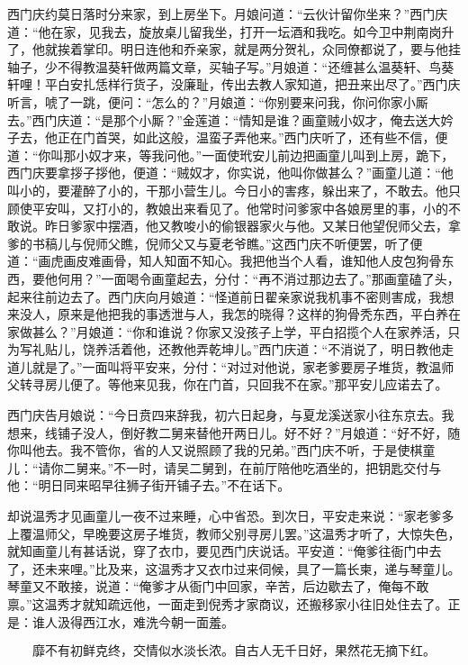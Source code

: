 西门庆约莫日落时分来家，到上房坐下。月娘问道：“云伙计留你坐来？”西门庆道：“他在家，见我去，旋放桌儿留我坐，打开一坛酒和我吃。如今卫中荆南岗升了，他就挨着掌印。明日连他和乔亲家，就是两分贺礼，众同僚都说了，要与他挂轴子，少不得教温葵轩做两篇文章，买轴子写。”月娘道：“还缠甚么温葵轩、鸟葵轩哩！平白安扎恁样行货子，没廉耻，传出去教人家知道，把丑来出尽了。”西门庆听言，唬了一跳，便问：“怎么的？”月娘道：“你别要来问我，你问你家小厮去。”西门庆道：“是那个小厮？”金莲道：“情知是谁？画童贼小奴才，俺去送大妗子去，他正在门首哭，如此这般，温蛮子弄他来。”西门庆听了，还有些不信，便道：“你叫那小奴才来，等我问他。”一面使玳安儿前边把画童儿叫到上房，跪下，西门庆要拿拶子拶他，便道：“贼奴才，你实说，他叫你做甚么？”画童儿道：“他叫小的，要灌醉了小的，干那小营生儿。今日小的害疼，躲出来了，不敢去。他只顾使平安叫，又打小的，教娘出来看见了。他常时问爹家中各娘房里的事，小的不敢说。昨日爹家中摆酒，他又教唆小的偷银器家火与他。又某日他望倪师父去，拿爹的书稿儿与倪师父瞧，倪师父又与夏老爷瞧。”这西门庆不听便罢，听了便道：“画虎画皮难画骨，知人知面不知心。我把他当个人看，谁知他人皮包狗骨东西，要他何用？”一面喝令画童起去，分付：“再不消过那边去了。”那画童磕了头，起来往前边去了。西门庆向月娘道：“怪道前日翟亲家说我机事不密则害成，我想来没人，原来是他把我的事透泄与人，我怎的晓得？这样的狗骨秃东西，平白养在家做甚么？”月娘道：“你和谁说？你家又没孩子上学，平白招揽个人在家养活，只为写礼贴儿，饶养活着他，还教他弄乾坤儿。”西门庆道：“不消说了，明日教他走道儿就是了。”一面叫将平安来，分付：“对过对他说，家老爹要房子堆货，教温师父转寻房儿便了。等他来见我，你在门首，只回我不在家。”那平安儿应诺去了。

西门庆告月娘说：“今日贲四来辞我，初六日起身，与夏龙溪送家小往东京去。我想来，线铺子没人，倒好教二舅来替他开两日儿。好不好？”月娘道：“好不好，随你叫他去。我不管你，省的人又说照顾了我的兄弟。”西门庆不听，于是使棋童儿：“请你二舅来。”不一时，请吴二舅到，在前厅陪他吃酒坐的，把钥匙交付与他：“明日同来昭早往狮子街开铺子去。”不在话下。

却说温秀才见画童儿一夜不过来睡，心中省恐。到次日，平安走来说：“家老爹多上覆温师父，早晚要这房子堆货，教师父别寻房儿罢。”这温秀才听了，大惊失色，就知画童儿有甚话说，穿了衣巾，要见西门庆说话。平安道：“俺爹往衙门中去了，还未来哩。”比及来，这温秀才又衣巾过来伺候，具了一篇长柬，递与琴童儿。琴童又不敢接，说道：“俺爹才从衙门中回家，辛苦，后边歇去了，俺每不敢禀。”这温秀才就知疏远他，一面走到倪秀才家商议，还搬移家小往旧处住去了。正是：谁人汲得西江水，难洗今朝一面羞。

\[
靡不有初鲜克终，交情似水淡长浓。
自古人无千日好，果然花无摘下红。
\]
